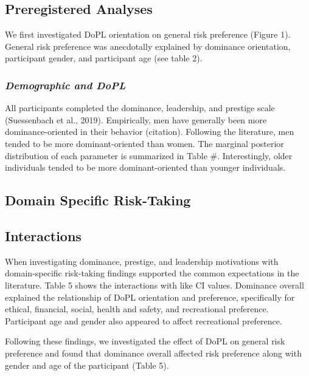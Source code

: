 \documentclass[
  english,
  a4paper,floatsintext]{apa7}
\begin{document}
\hypertarget{preregistered-analyses}{%
\subsection{Preregistered Analyses}\label{preregistered-analyses}}

We first investigated DoPL orientation on general risk preference (Figure 1). General risk preference was anecdotally explained by dominance orientation, participant gender, and participant age (see table 2).

\hypertarget{demographic-and-dopl}{%
\subsubsection{\texorpdfstring{\emph{Demographic and DoPL}}{Demographic and DoPL}}\label{demographic-and-dopl}}

All participants completed the dominance, leadership, and prestige scale (Suessenbach et al., 2019). Empirically, men have generally been more dominance-oriented in their behavior (citation). Following the literature, men tended to be more dominant-oriented than women. The marginal posterior distribution of each parameter is summarized in Table \#. Interestingly, older individuals tended to be more dominant-oriented than younger individuals.

\hypertarget{domain-specific-risk-taking}{%
\subsection{Domain Specific Risk-Taking}\label{domain-specific-risk-taking}}

\hypertarget{interactions}{%
\subsection{Interactions}\label{interactions}}

When investigating dominance, prestige, and leadership motivations with domain-specific risk-taking findings supported the common expectations in the literature. Table 5 shows the interactions with like CI values. Dominance overall explained the relationship of DoPL orientation and preference, specifically for ethical, financial, social, health and safety, and recreational preference. Participant age and gender also appeared to affect recreational preference.

Following these findings, we investigated the effect of DoPL on general risk preference and found that dominance overall affected risk preference along with gender and age of the participant (Table 5).
\end{document}
